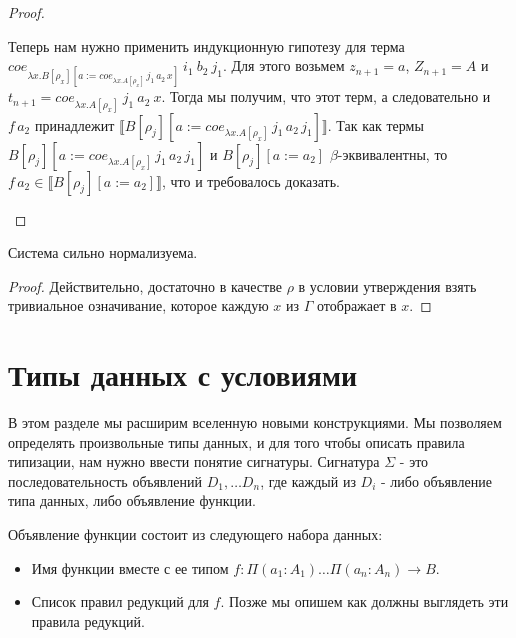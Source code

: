 \documentclass{amsart}
\theoremstyle{definition}
\theoremstyle{remark}
\renewcommand{\ll}{\llbracket}
\newcommand{\rr}{\rrbracket}
\numberwithin{figure}{section}
\begin{document}
\begin{proof}
\begin{itemize}
Теперь нам нужно применить индукционную гипотезу для терма $coe_{\lambda x. B[\rho_x][a := coe_{\lambda x. A[\rho_x]}\,j_1\,a_2\,x]}\ i_1\ b_2\ j_1$.
Для этого возьмем $z_{n+1} = a$, $Z_{n+1} = A$ и $t_{n+1} = coe_{\lambda x. A[\rho_x]}\ j_1\ a_2\ x$.
Тогда мы получим, что этот терм, а следовательно и $f\,a_2$ принадлежит $\ll B[\rho_j][a := coe_{\lambda x. A[\rho_x]}\,j_1\,a_2\,j_1] \rr$.
Так как термы $B[\rho_j][a := coe_{\lambda x. A[\rho_x]}\,j_1\,a_2\,j_1]$ и $B[\rho_j][a := a_2]$ $\beta$-эквивалентны,
    то $f\,a_2 \in \ll B[\rho_j][a := a_2] \rr$, что и требовалось доказать.

\end{itemize}
\end{proof}

\begin{cor}
Система сильно нормализуема.
\end{cor}
\begin{proof}
Действительно, достаточно в качестве $\rho$ в условии утверждения взять тривиальное означивание, которое каждую $x$ из $\Gamma$ отображает в $x$.
\end{proof}

\section{Типы данных с условиями}

В этом разделе мы расширим вселенную новыми конструкциями.
Мы позволяем определять произвольные типы данных, и для того чтобы описать правила типизации, нам нужно ввести понятие сигнатуры.
Сигнатура $\Sigma$ - это последовательность объявлений $D_1, \ldots D_n$, где каждый из $D_i$ - либо объявление типа данных, либо объявление функции.

Объявление функции состоит из следующего набора данных:
\begin{itemize}
\item Имя функции вместе с ее типом $f : \Pi (a_1 : A_1) \ldots \Pi (a_n : A_n) \to B$.
\item Список правил редукций для $f$. Позже мы опишем как должны выглядеть эти правила редукций.
\end{itemize}
\end{document}
